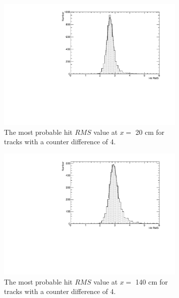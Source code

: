 \begin{figure}[h!]
  \centering
  \begin{subfigure}{0.45\textwidth}
    \centering
    \includegraphics[width=\textwidth]{DataCan_0}
    \caption{The most probable hit $RMS$ value at $x =$ 20 cm for tracks with a counter difference of 4.}
  \end{subfigure}
  \hspace{0.08\textwidth}
  \begin{subfigure}{0.45\textwidth}
    \centering
    \includegraphics[width=\textwidth]{DataCan_1}
    \caption{The most probable hit $RMS$ value at $x =$ 140 cm for tracks with a counter difference of 4.}
  \end{subfigure}
  \begin{subfigure}{0.45\textwidth}
    \centering

\end{subfigure}
\end{figure}
